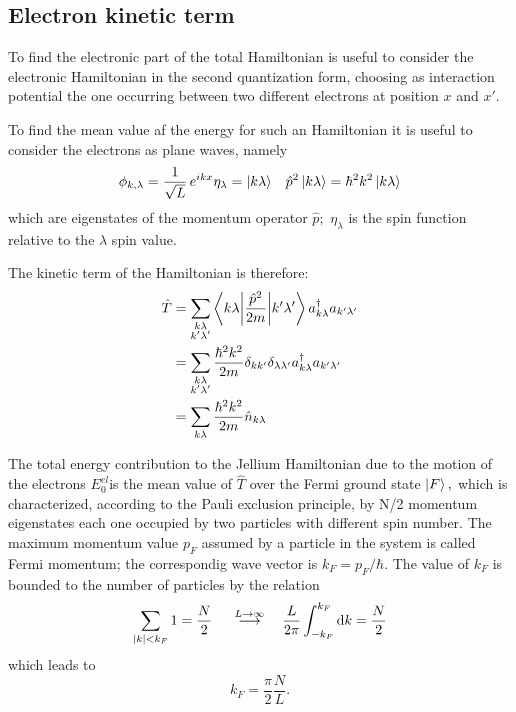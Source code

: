 \documentclass[a4paper]{article}
\begin{document}
\subsection*{Electron kinetic term}

\noindent To find the electronic part of the total Hamiltonian is useful to consider the electronic Hamiltonian in the second quantization form, choosing as interaction potential the one occurring between two different electrons at position $x$ and $x'.$

\noindent To find the mean value af the energy for such an Hamiltonian it is useful to consider the electrons as plane waves, namely
\begin{align}
\phi_{k,\lambda} &= \frac{1}{\sqrt{L}}\,e^{ikx}\eta_\lambda = \ket{k\lambda} &\hat{p}^2 \ket{k\lambda} = \hbar^2k^2\ket{k\lambda}
\end{align}
which are eigenstates of the momentum operator $\hat{p};$ $\eta_\lambda$ is the spin function relative to the $\lambda$ spin value.

\noindent The kinetic term of the Hamiltonian is therefore:
\begin{align}
\hat{T} &= \sum_{\substack{k\lambda\\k'\lambda'}} \mel**{k\lambda}{\frac{\hat{p}^2}{2m}}{k'\lambda'} a^\dag_{k\lambda}a _{k'\lambda'}\\
 &=\sum_{\substack{k\lambda\\k'\lambda'}} \frac{\hbar^2k^2}{2m} \delta_{kk'}\delta_{\lambda \lambda'} a^\dag_{k\lambda}a _{k'\lambda'}\\
 &=\sum_{k\lambda} \frac{\hbar^2k^2}{2m} \hat{n}_{k\lambda} \label{eq:kinetic1}
\end{align}

The total energy contribution to the Jellium Hamiltonian due to the motion of the electrons $E_0^{el}$is the mean value of $\hat{T}$ over the Fermi ground state $\ket{F}, $ which is characterized, according to the Pauli exclusion principle, by N/2 momentum eigenstates each one occupied by two particles with different spin number.
The maximum momentum value $p_F$ assumed by a particle in the system is called Fermi momentum; the correspondig wave vector is ${k_F} = {p_F}/\hbar.$
The value of $k_F$ is bounded to the number of particles by the relation \begin{equation} \sum_{\abs{k} < k_F} 1 = \frac{N}{2}\ \quad \stackrel{L\rightarrow \infty}{\longrightarrow} \quad \frac{L}{2\pi} \int_{-k_F}^{k_F} \dd{k} = \frac{N}{2}\end{equation} which leads to \begin{equation}   k_F = \frac{\pi}{2}\frac{N}{L}.\end{equation}
\end{document}
